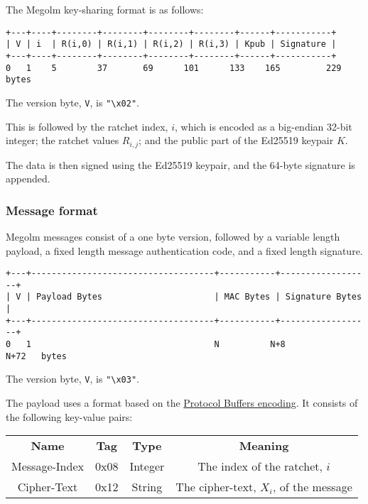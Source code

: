 \documentclass[10pt]{article}
\makeatletter
\newcommand\tmpset[2]{
  \begingroup
  #1
  #2
  \endgroup
}
\newcommand\autoscaletable[3][0pt]{
  \tmpset{\setlength\tabcolsep{#1}}{
    \noindent
    \begin{tabular*}{\textwidth}{@{\extracolsep{\fill}} #2}
      #3
    \end{tabular*}}
}
\makeatother
\begin{document}
The Megolm key-sharing format is as follows:

\begin{verbatim}
+---+----+--------+--------+--------+--------+------+-----------+
| V | i  | R(i,0) | R(i,1) | R(i,2) | R(i,3) | Kpub | Signature |
+---+----+--------+--------+--------+--------+------+-----------+
0   1    5        37       69      101      133    165         229   bytes
\end{verbatim}

The version byte, \texttt{V}, is \texttt{"\textbackslash{}x02"}.

This is followed by the ratchet index, \(i\), which is encoded as a
big-endian 32-bit integer; the ratchet values \(R_{i,j}\); and the
public part of the Ed25519 keypair \(K\).

The data is then signed using the Ed25519 keypair, and the 64-byte
signature is appended.

\subsubsection{Message format}\label{message-format}

Megolm messages consist of a one byte version, followed by a variable
length payload, a fixed length message authentication code, and a fixed
length signature.

\begin{verbatim}
+---+------------------------------------+-----------+------------------+
| V | Payload Bytes                      | MAC Bytes | Signature Bytes  |
+---+------------------------------------+-----------+------------------+
0   1                                    N          N+8                N+72   bytes
\end{verbatim}

The version byte, \texttt{V}, is \texttt{"\textbackslash{}x03"}.

The payload uses a format based on the
\href{https://developers.google.com/protocol-buffers/docs/encoding}{Protocol
Buffers encoding}. It consists of the following key-value pairs:

\autoscaletable{c c c c}{\textbf{Name} & \textbf{Tag} & \textbf{Type} & \textbf{Meaning} \\ Message-Index & 0x08 & Integer & The index of the ratchet, $i$ \\
Cipher-Text & 0x12 & String & The cipher-text, $X_i$, of the message \\}
\end{document}
